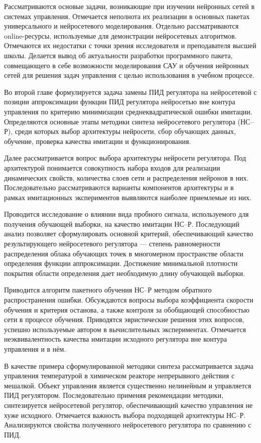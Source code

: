 Рассматриваются основые задачи, возникающие при изучении нейронных
сетей в системах управления.  Отмечается неполнота их реализации в
основных пакетах универсального и нейросетевого моделирования.
Отдельно рассматриваются online-ресурсы, используемые для демонстрации
нейросетевых алгоритмов.  Отмечаются их недостатки с точки зрения
исследователя и преподавателя высшей школы.  Делается вывод об
актуальности разработки программного пакета, совмещающего в себе
возможности моделирования САУ и обучения нейронных сетей для решения
задач управления с целью использования в учебном процессе.


Во второй главе формулируется задача замены ПИД регулятора на
нейросетевой с позиции аппроксимации функции ПИД регулятора нейросетью
вне контура управления по критерию минимизации среднеквадратической
ошибки имитации.  Определяются основные этапы методики синтеза
нейросетевого регулятора (НС--Р), среди которых выбор архитектуры
нейросети, сбор обучающих данных, обучение, проверка качества имитации
и функционирования.

Далее рассматривается вопрос выбора архитектуры нейросети регулятора.
Под архитектурой понимается совокупность набора входов для реализации
динамических свойств, количества слоев сети и распределения нейронов в
них.  Последовательно рассматриваются варианты компонентов архитектуры
и в рамках имитационных экспериментов выявляются наиболее приемлемые
из них.

Проводится исследование о влиянии вида пробного сигнала, используемого
для получения обучающей выборки, на качество имитации НС--Р.
Последующий анализ позволяет сформулировать основной критерий,
обеспечивающий качество результирующего нейросетевого регулятора ---
степень равномерности распределения облака обучающих точек в
многомерном пространстве области определения функции аппроксимации.
Достижение минимальной плотности покрытия области определения дает
необходимую длину обучающей выборки.

Приводится алгоритм пакетного обучения НС--Р методом обратного
распространения ошибки.  Обсуждаются вопросы выбора коэффициента
скорости обучения и критерия останова, а также контроля за обобщающей
способностью сети в процессе обучения.  Приводятся эвристические
решения этих вопросов, успешно используемые автором в вычислительных
экспериментах.  Отмечается неэквивалентность качества имитации
исходного регулятора вне контура управления и в нём.

В качестве примера сформулированной методики синтеза рассматривается
задача управления температурой в химическом реакторе непрерывного
действия с мешалкой.  Объект управления является существенно
нелинейным и управляется ПИД регулятором.  Последовательно применяя
рекомендации методики, синтезируется нейросетевой регулятор,
обеспечивающий качество управления не хуже исходного.  Отмечается
важность выбора подходящей архитектуры НС--Р.  Анализируются свойства
полученного нейросетевого регулятора по сравнению с ПИД.

